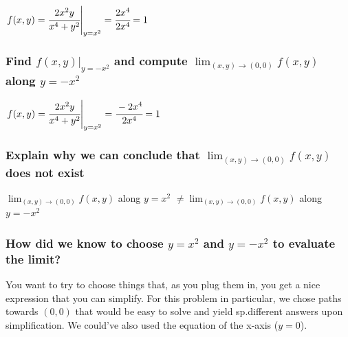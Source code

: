 \documentclass[
  letterpaper,
  DIV=11,
  numbers=noendperiod]{scrartcl}
\begin{document}
\(\left.f(x,y) = \cfrac{2x^2y}{x^4 +y^2}\right\vert_{y=x^2} = \cfrac{2x^4}{2x^4} = 1\)

\hypertarget{find-left.fx-yrightvert_y-x2-and-compute-lim_x-y-rightarrow-0-0-fx-y-along-y-x2}{%
\subsubsection{\texorpdfstring{Find
\(\left.f(x, y)\right\vert_{y=-x^2}\) and compute
\(\lim_{(x, y) \rightarrow (0, 0)} f(x, y)\) along
\(y=-x^2\)}{Find \textbackslash left.f(x, y)\textbackslash right\textbackslash vert\_\{y=-x\^{}2\} and compute \textbackslash lim\_\{(x, y) \textbackslash rightarrow (0, 0)\} f(x, y) along y=-x\^{}2}}\label{find-left.fx-yrightvert_y-x2-and-compute-lim_x-y-rightarrow-0-0-fx-y-along-y-x2}}

\(\left.f(x,y) = \cfrac{2x^2y}{x^4 +y^2}\right\vert_{y=x^2} = \cfrac{-2x^4}{2x^4} = 1\)

\hypertarget{explain-why-we-can-conclude-that-lim_x-y-rightarrow-0-0-fxy-does-not-exist}{%
\subsubsection{\texorpdfstring{Explain why we can conclude that
\(\lim_{(x, y) \rightarrow (0, 0)} f(x,y)\) does not
exist}{Explain why we can conclude that \textbackslash lim\_\{(x, y) \textbackslash rightarrow (0, 0)\} f(x,y) does not exist}}\label{explain-why-we-can-conclude-that-lim_x-y-rightarrow-0-0-fxy-does-not-exist}}

\(\lim_{(x,y) \rightarrow(0,0)}f(x,y)\) along \(y=x^2\)
\(\ne \lim_{(x, y)\rightarrow(0, 0)}f(x, y)\) along \(y=-x^2\)

\hypertarget{how-did-we-know-to-choose-yx2-and-y-x2-to-evaluate-the-limit}{%
\subsubsection{\texorpdfstring{How did we know to choose \(y=x^2\) and
\(y=-x^2\) to evaluate the
limit?}{How did we know to choose y=x\^{}2 and y=-x\^{}2 to evaluate the limit?}}\label{how-did-we-know-to-choose-yx2-and-y-x2-to-evaluate-the-limit}}

You want to try to choose things that, as you plug them in, you get a
nice expression that you can simplify. For this problem in particular,
we chose paths towards \((0, 0)\) that would be easy to solve and yield
sp.different answers upon simplification. We could've also used the
equation of the x-axis (\(y=0\)).
\end{document}
